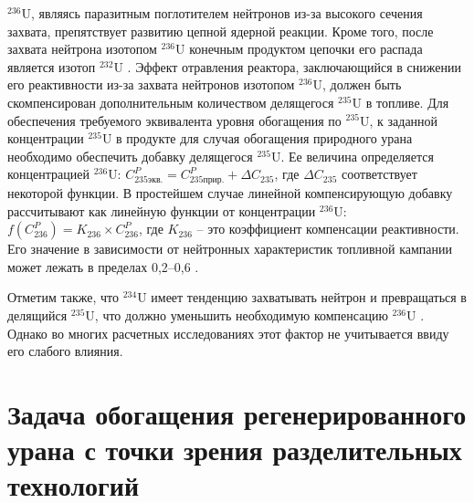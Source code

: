 $^{236}$U, являясь паразитным поглотителем нейтронов из-за высокого сечения захвата, препятствует развитию цепной ядерной реакции. Кроме того, после захвата нейтрона изотопом  $^{236}$U конечным продуктом цепочки его распада является изотоп  $^{232}$U \cite{ksenofontovIssledovanieProblemyVovlecheniya1988}.
Эффект отравления реактора, заключающийся в снижении его реактивности из-за захвата нейтронов изотопом  $^{236}$U, должен быть скомпенсирован дополнительным количеством делящегося $^{235}$U в топливе. Для обеспечения требуемого эквивалента уровня обогащения по $^{235}$U, к заданной концентрации $^{235}$U в продукте для случая обогащения природного урана необходимо обеспечить добавку делящегося $^{235}$U.
Ее величина определяется концентрацией $^{236}$U:
$C_{235 экв.}^{P}=C_{235 прир.}^{P}+\Delta C_{235}$, где $\Delta C_{235}$ соответствует некоторой функции. В простейшем случае линейной компенсирующую добавку рассчитывают как линейную функции от концентрации $^{236}$U: $f(C_{236}^{P})=K_{236} \times C_{236}^{P}$, где $K_{236}$ -- это коэффициент компенсации реактивности. Его значение в зависимости от нейтронных характеристик топливной кампании может лежать в пределах 0,2--0,6 \cite{delagarzaMulticomponentIsotopeSeparation1961, delculAnalysisReuseUranium2009}. 

Отметим также, что $^{234}$U имеет тенденцию захватывать нейтрон и превращаться в делящийся $^{235}$U, что должно уменьшить необходимую компенсацию $^{236}$U \cite{dyachenkoIspolzovanieRegenerirovannogoUrana2012}. Однако во многих расчетных исследованиях этот фактор не учитывается ввиду его слабого влияния.



\section{Задача обогащения регенерированного урана с точки зрения разделительных технологий}

